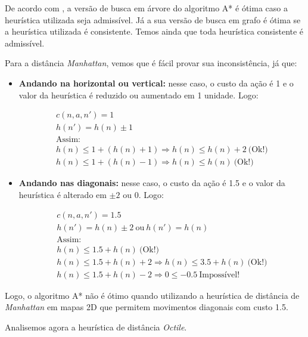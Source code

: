 \documentclass[12pt]{article}
\begin{document}
De acordo com \cite{russell2016artificial}, a versão de busca em árvore do algoritmo A* é ótima caso a heurística utilizada seja admissível. Já a sua versão de busca em grafo é ótima se a heurística utilizada é consistente. Temos ainda que toda heurística consistente é admissível.


Para a distância \textit{Manhattan}, vemos que é fácil provar sua inconsistência, já que:

\begin{itemize}
	\item \textbf{Andando na horizontal ou vertical:} nesse caso, o custo da ação é 1 e o valor da heurística é reduzido ou aumentado em 1 unidade. Logo:

	\begin{align*}
		c(n, a, n') = 1 \\
		h(n') = h(n) \pm 1 \\
		\text{Assim:} \\
		h(n) \leq 1 + (h(n) + 1) \Rightarrow h(n) \leq h(n) + 2 ~ \text{(Ok!)} \\
		h(n) \leq 1 + (h(n) - 1) \Rightarrow h(n) \leq h(n) ~ \text{(Ok!)} 
	\end{align*}

	\item \textbf{Andando nas diagonais:} nesse caso, o custo da ação é 1.5 e o valor da heurística é alterado em $ \pm 2 $ ou $ 0 $. Logo:

	\begin{align*}
		c(n, a, n') = 1.5 \\
		h(n') = h(n) \pm 2 ~ \text{ou} ~ h(n') = h(n) \\
		\text{Assim:} \\
		h(n) \leq 1.5 + h(n) ~ \text{(Ok!)} \\
		h(n) \leq 1.5 + h(n) + 2 \Rightarrow h(n) \leq 3.5 + h(n) ~ \text{(Ok!)} \\
		h(n) \leq 1.5 + h(n) - 2 \Rightarrow 0 \leq -0.5 ~ \text{Impossível!}
	\end{align*}
\end{itemize}

Logo, o algoritmo A* não é ótimo quando utilizando a heurística de distância de \textit{Manhattan} em mapas 2D que permitem movimentos diagonais com custo 1.5.

Analisemos agora a heurística de distância \textit{Octile}.
\end{document}
